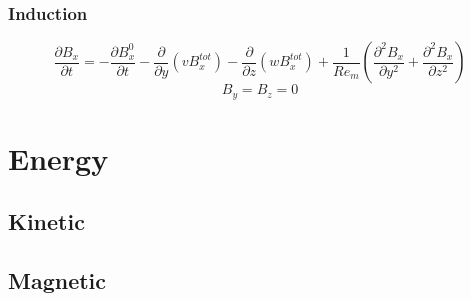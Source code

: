 \documentclass[11pt]{article}
\begin{document}
\subsubsection{Induction}
\begin{equation}
	\frac{\partial B_x}{\partial t} 
	=
	- \frac{\partial B_x^0}{\partial t}
	- \frac{\partial}{\partial y} (v B_x^{tot})
	- \frac{\partial}{\partial z} (w B_x^{tot})
	+ \frac{1}{Re_m}
	\left(
	\frac{\partial^2 B_x}{\partial y^2}
	+
	\frac{\partial^2 B_x}{\partial z^2}
	\right)
\end{equation}
\begin{equation}
	B_y = B_z = 0
\end{equation}

\section{Energy}


\subsection{Kinetic}

\subsection{Magnetic}

\end{document}
